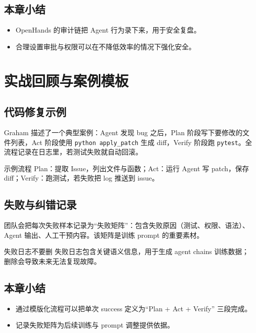 \documentclass[a4paper]{article}
\begin{document}
\subsection{本章小结}
\begin{itemize}
    \item OpenHands 的审计链把 Agent 行为录下来，用于安全复盘。
    \item 合理设置审批与权限可以在不降低效率的情况下强化安全。
\end{itemize}

\section{实战回顾与案例模板}
\subsection{代码修复示例}
Graham 描述了一个典型案例：Agent 发现 bug 之后，Plan 阶段写下要修改的文件列表，Act 阶段使用 \texttt{python apply\_patch} 生成 diff，Verify 阶段跑 \texttt{pytest}。全流程记录在日志里，若测试失败就自动回滚。

\begin{knowledgebox}{示例流程}
Plan：提取 Issue，列出文件与函数；Act：运行 Agent 写 patch，保存 diff；Verify：跑测试，若失败把 log 推送到 issue。
\end{knowledgebox}

\subsection{失败与纠错记录}
团队会把每次失败样本记录为“失败矩阵”：包含失败原因（测试、权限、语法）、Agent 输出、人工干预内容。该矩阵是训练 prompt 的重要素材。

\begin{warningbox}{失败日志不要删}
失败日志包含关键语义信息，用于生成 agent chains 训练数据；删除会导致未来无法复现故障。
\end{warningbox}

\subsection{本章小结}
\begin{itemize}
    \item 通过模版化流程可以把单次 success 定义为“Plan + Act + Verify” 三段完成。
    \item 记录失败矩阵为后续训练与 prompt 调整提供依据。
\end{itemize}
\end{document}
